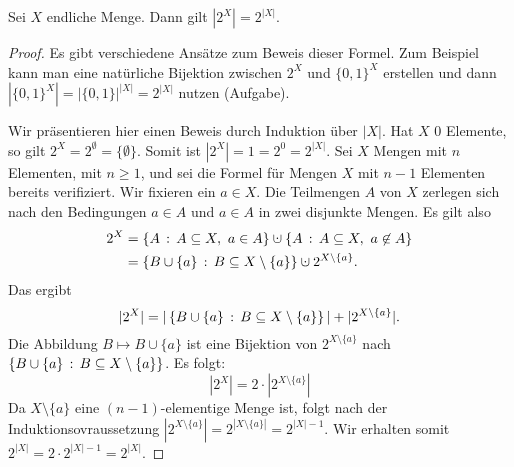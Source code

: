 \begin{thm}
	Sei $X$ endliche Menge. Dann gilt $|2^X|=2^{|X|}$. 
\end{thm} 
\begin{proof} 
	Es gibt verschiedene Ansätze zum Beweis dieser Formel. Zum Beispiel kann man eine natürliche Bijektion zwischen  $2^X$ und $\{0,1\}^X$ erstellen und dann $|\{0,1\}^X| = |\{0,1\}|^{|X|} = 2^{|X|}$ nutzen (Aufgabe). 
	
	Wir präsentieren hier einen Beweis durch Induktion über $|X|$. Hat $X$ $0$ Elemente, so gilt $2^X = 2^\emptyset = \{\emptyset\}$. Somit ist $|2^X| = 1 = 2^0 = 2^{|X|}$. Sei $X$ Mengen mit $n$ Elementen, mit $n \ge 1$, und sei die Formel für Mengen $X$ mit $n-1$ Elementen bereits verifiziert. Wir fixieren ein $a \in X$. Die Teilmengen $A$ von $X$ zerlegen sich nach den Bedingungen $a \in A$ und $a \in A$ in zwei disjunkte Mengen. Es gilt also
	\begin{align*}
			2^X & = \setcond{A}{A \subseteq X, \ a \in A} \cupdot \setcond{A}{A \subseteq X, \ a \not\in A}
			\\ & = \setcond{B \cup \{a\}}{B \subseteq X \setminus \{a\}} \cupdot 2^{X \setminus \{a\}}. 
	\end{align*}
	Das ergibt
	\[
		|2^X| = |\left\{ B \cup \{a\} \,:\, B \subseteq X \setminus \{a\} \right\}| + | 2^{X \setminus \{a\}}|. 
	\]
	Die Abbildung $B \mapsto B \cup \{a\}$ ist eine Bijektion von $2^{X \setminus \{a\}}$ nach $\left\{ B \cup \{a\} \,:\, B \subseteq X \setminus \{a\} \right\}$. Es folgt: 
	\[
		|2^X| = 2 \cdot |2^{X \setminus \{a\}}|
	\]
	Da $X \setminus \{a\}$ eine $(n-1)$-elementige Menge ist, folgt nach der Induktionsovraussetzung $|2^{X \setminus \{a\}}| = 2^{|X \setminus \{a\}|} = 2^{|X|-1}$. Wir erhalten somit $2^{|X|} = 2 \cdot 2^{|X|-1} = 2^{|X|}$. 
\end{proof} 

